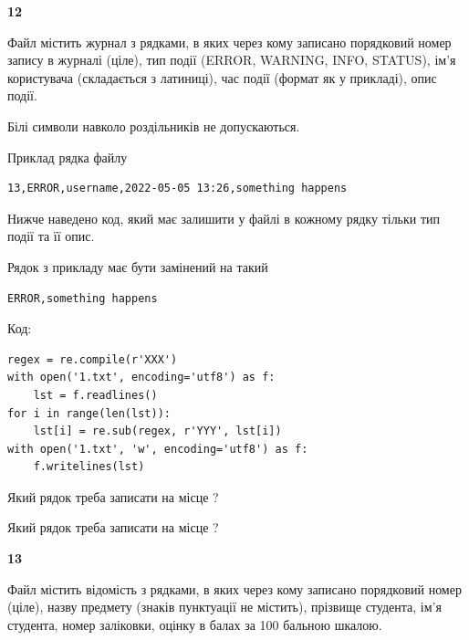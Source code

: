 \newpage

{\begin {center}\textbf{ 12}\end {center}}\par
Файл  містить журнал з рядками, в яких через кому записано поряд\-ко\-вий номер запису в журналі (ціле), тип події (ERROR, WARNING, INFO, STATUS), ім'я користувача (складається з латиниці), час події (фор\-мат як у прикладі), опис події.

Білі символи навколо роздільників не допускаються.

Приклад рядка файлу



\begin{verbatim}
13,ERROR,username,2022-05-05 13:26,something happens
\end{verbatim}


Нижче наведено код, який має залишити у файлі в кожному рядку тільки тип події та її опис.

Рядок з прикладу має бути замінений на такий



\begin{verbatim}
ERROR,something happens
\end{verbatim}




Код:



\begin{verbatim}
regex = re.compile(r'XXX')
with open('1.txt', encoding='utf8') as f:
    lst = f.readlines()
for i in range(len(lst)):
    lst[i] = re.sub(regex, r'YYY', lst[i])
with open('1.txt', 'w', encoding='utf8') as f:
    f.writelines(lst)
\end{verbatim}









Який рядок треба записати на місце  ?\par
\vspace{5mm}


Який рядок треба записати на місце  ?\par


\newpage

{\begin {center}\textbf{ 13}\end {center}}\par
Файл  містить відомість з рядками, в яких через кому записано поряд\-ковий номер (ціле), назву предмету (знаків пунктуації не містить), прізвище студента, ім'я студента, номер заліковки, оцінку в балах за 100 бальною шкалою.

